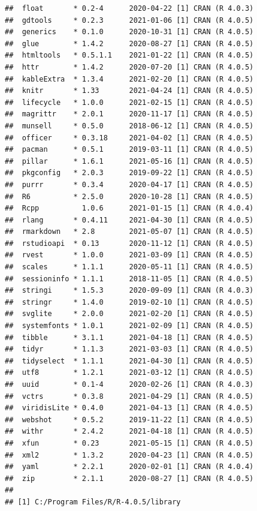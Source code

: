\documentclass[
  11pt,
]{article}
\begin{document}
\begin{verbatim}
##  float       * 0.2-4      2020-04-22 [1] CRAN (R 4.0.3)                   
##  gdtools     * 0.2.3      2021-01-06 [1] CRAN (R 4.0.5)                   
##  generics    * 0.1.0      2020-10-31 [1] CRAN (R 4.0.5)                   
##  glue        * 1.4.2      2020-08-27 [1] CRAN (R 4.0.5)                   
##  htmltools   * 0.5.1.1    2021-01-22 [1] CRAN (R 4.0.5)                   
##  httr        * 1.4.2      2020-07-20 [1] CRAN (R 4.0.5)                   
##  kableExtra  * 1.3.4      2021-02-20 [1] CRAN (R 4.0.5)                   
##  knitr       * 1.33       2021-04-24 [1] CRAN (R 4.0.5)                   
##  lifecycle   * 1.0.0      2021-02-15 [1] CRAN (R 4.0.5)                   
##  magrittr    * 2.0.1      2020-11-17 [1] CRAN (R 4.0.5)                   
##  munsell     * 0.5.0      2018-06-12 [1] CRAN (R 4.0.5)                   
##  officer     * 0.3.18     2021-04-02 [1] CRAN (R 4.0.5)                   
##  pacman      * 0.5.1      2019-03-11 [1] CRAN (R 4.0.5)                   
##  pillar      * 1.6.1      2021-05-16 [1] CRAN (R 4.0.5)                   
##  pkgconfig   * 2.0.3      2019-09-22 [1] CRAN (R 4.0.5)                   
##  purrr       * 0.3.4      2020-04-17 [1] CRAN (R 4.0.5)                   
##  R6          * 2.5.0      2020-10-28 [1] CRAN (R 4.0.5)                   
##  Rcpp          1.0.6      2021-01-15 [1] CRAN (R 4.0.4)                   
##  rlang       * 0.4.11     2021-04-30 [1] CRAN (R 4.0.5)                   
##  rmarkdown   * 2.8        2021-05-07 [1] CRAN (R 4.0.5)                   
##  rstudioapi  * 0.13       2020-11-12 [1] CRAN (R 4.0.5)                   
##  rvest       * 1.0.0      2021-03-09 [1] CRAN (R 4.0.5)                   
##  scales      * 1.1.1      2020-05-11 [1] CRAN (R 4.0.5)                   
##  sessioninfo * 1.1.1      2018-11-05 [1] CRAN (R 4.0.5)                   
##  stringi     * 1.5.3      2020-09-09 [1] CRAN (R 4.0.3)                   
##  stringr     * 1.4.0      2019-02-10 [1] CRAN (R 4.0.5)                   
##  svglite     * 2.0.0      2021-02-20 [1] CRAN (R 4.0.5)                   
##  systemfonts * 1.0.1      2021-02-09 [1] CRAN (R 4.0.5)                   
##  tibble      * 3.1.1      2021-04-18 [1] CRAN (R 4.0.5)                   
##  tidyr       * 1.1.3      2021-03-03 [1] CRAN (R 4.0.5)                   
##  tidyselect  * 1.1.1      2021-04-30 [1] CRAN (R 4.0.5)                   
##  utf8        * 1.2.1      2021-03-12 [1] CRAN (R 4.0.5)                   
##  uuid        * 0.1-4      2020-02-26 [1] CRAN (R 4.0.3)                   
##  vctrs       * 0.3.8      2021-04-29 [1] CRAN (R 4.0.5)                   
##  viridisLite * 0.4.0      2021-04-13 [1] CRAN (R 4.0.5)                   
##  webshot     * 0.5.2      2019-11-22 [1] CRAN (R 4.0.5)                   
##  withr       * 2.4.2      2021-04-18 [1] CRAN (R 4.0.5)                   
##  xfun        * 0.23       2021-05-15 [1] CRAN (R 4.0.5)                   
##  xml2        * 1.3.2      2020-04-23 [1] CRAN (R 4.0.5)                   
##  yaml        * 2.2.1      2020-02-01 [1] CRAN (R 4.0.4)                   
##  zip         * 2.1.1      2020-08-27 [1] CRAN (R 4.0.5)                   
## 
## [1] C:/Program Files/R/R-4.0.5/library
\end{verbatim}
\end{document}
